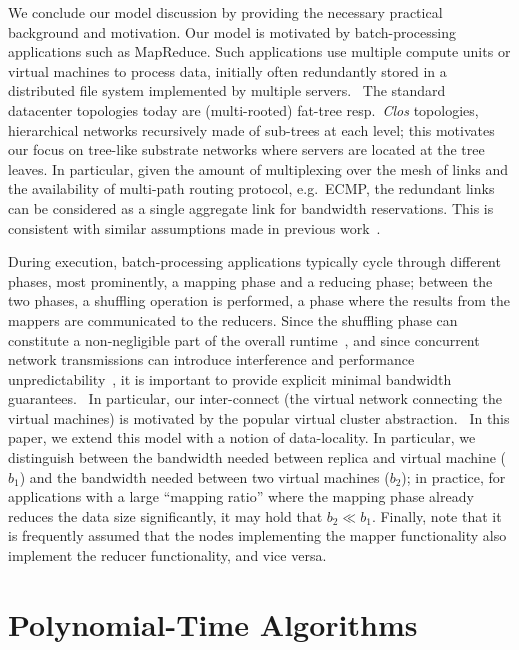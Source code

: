 \documentclass[9pt]{sigcomm-alternate}
\newcommand{\CostTrans}{\ensuremath{b_1}}
\newcommand{\CostCom}{\ensuremath{b_2}}
\begin{document}
We conclude our model discussion by providing the necessary practical background and motivation.
Our model is motivated by batch-processing applications such as MapReduce.
Such applications use multiple compute units or virtual machines to
process data, initially often redundantly stored in a distributed file system implemented
by multiple servers.~\cite{mapreduce}
The standard datacenter topologies today are (multi-rooted) fat-tree resp.~\emph{Clos} topologies,~\cite{fattree,vl2}
hierarchical networks  recursively made of sub-trees at each level; this motivates our
focus on tree-like substrate networks where servers are located at the
tree leaves. In particular, given the amount of multiplexing over the mesh of links
and the availability of multi-path routing protocol, e.g.~ECMP, the redundant
links can be considered as a single aggregate link for bandwidth
reservations. This is consistent with similar assumptions made in
previous work~\cite{oktopus,proteus}.

During execution, batch-processing applications typically cycle through different phases,
most prominently, a mapping phase and a reducing phase; between the two phases,
a shuffling operation is performed, a phase where the results from the mappers
are communicated to the reducers. Since the shuffling phase can constitute a
non-negligible part of the overall runtime~\cite{orchestra},
and since concurrent network transmissions can introduce interference and
performance unpredictability~\cite{amazonbw}, it is important
to provide explicit minimal bandwidth guarantees.~\cite{talk-about}
In particular, our inter-connect (the virtual network connecting the virtual machines)
is motivated by the popular virtual cluster abstraction.~\cite{oktopus,talk-about,proteus}
In this paper, we extend this model with a notion of data-locality.
In particular, we distinguish between the bandwidth needed between replica
and virtual machine ($\CostTrans$) and the bandwidth needed between
two virtual machines ($\CostCom$); in practice, for applications with a large
``mapping ratio'' where the mapping phase already reduces the data size significantly,
it may hold that $\CostCom\ll\CostTrans$. Finally, note that it is frequently assumed
that the nodes implementing the mapper functionality also implement the reducer functionality,
and vice versa.

\section{Polynomial-Time Algorithms}\label{sec:poly}
\end{document}
